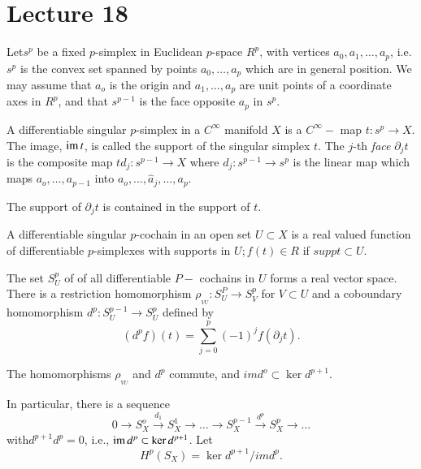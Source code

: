\chapter{Lecture 18} %
 
Let\pageoriginale $s^p $ be a fixed $p$-simplex in Euclidean $p$-space
$ R^p $, 
with vertices $ a_0, a_1, \ldots , a_p$, i.e. $s^p$ is the convex set
spanned by points $ a_0 , \ldots , a_p $ which are in general
position. We may  assume  that $a_o $ is the origin and $ a_1 ,
\ldots , a_p $ are unit points of a coordinate axes in $R^p $, and
that $s^{p-1} $ is the face opposite  $ a_p $ in $ s^p $. 
 
\begin{defi*}%
A differentiable singular $p$-simplex in a $ C^\infty $
manifold $X$ is a $ C^\infty -$ map $t : s^p \rightarrow  X $. The
image, $\operatorname{im} t$, is called the support of the singular simplex $t$. The $j$-th
\textit{face}  $ \partial_j t $ is the composite map $t d_j : s^{p-1}
\rightarrow X $ where $ d_j : s^{p-1} \rightarrow s^p $ is the linear
map which maps $ a_o , \ldots , a_{p-1} $ into $ a_o, \ldots ,
\hat{a}_j, \ldots , a_p $.  
   \end{defi*}   
   
 The support of $ \partial_j t $ is contained in the support of $t$. 
 
 \begin{defi*}%
 A differentiable singular $p$-cochain in an open set  $ U
\subset X $ is a real valued function of differentiable $p$-simplexes
with supports in  $ U;  f (t ) \in R $ if $ supp t \subset U$. 
 \end{defi*} 
 
 The set $ S^p_U $ of of all differentiable $P-$ cochains in $ U $
 forms a real vector space. There is a restriction homomorphism $
 \rho_{_{VU}} : S^P_U \rightarrow  S^p_V$ for $V \subset U$ and a  
 coboundary  homomorphism $d^p : S^{p-1}_U \rightarrow S^p_U$ defined
 by  
 $$
 ( d^p f ) (t) = \sum^p_{j=0} (-1)^j f ( \partial_j t ). 
 $$
 
 The homomorphisms  $ \rho_{_{VU}} $ and $ d^p $ commute, and $ im d^o
 \subset \ker d^{p+1} $. 
 
 In particular, there is a sequence  
$$
 0 \rightarrow S^o_X \xrightarrow{d_1} S_X^1 \rightarrow \dots
 \rightarrow S^{p-1}_X \xrightarrow{d^p} S^p_X \rightarrow \dots  
 $$ 
 with\pageoriginale $ d^{p+1} d^p = 0$, i.e., $\operatorname{im} d^p \subset \ker
 d^{p+1} $. Let  
 $$
 H^p (S_X) = \ker d^{p+1} / im d^p .
 $$
 
